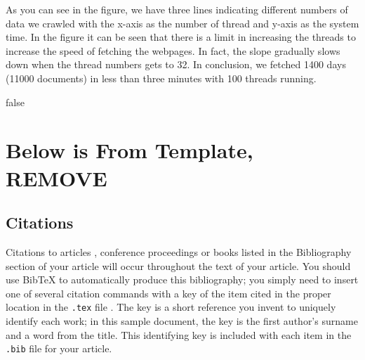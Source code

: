 \documentclass{sig-alternate-05-2015}
\begin{document}

As you can see in the figure, we have three lines indicating different numbers of data we crawled with the x-axis as the number of thread and y-axis as the system time. In the figure it can be seen that there is a limit in increasing the threads to increase the speed of fetching the webpages. In fact, the slope gradually slows down when the thread numbers gets to 32. In conclusion, we fetched 1400 days (11000 documents) in less than three minutes with 100 threads running.  




%
%
\if false

\section{Below is From Template, REMOVE}
\subsection{Citations}
Citations to articles \cite{bowman:reasoning,
clark:pct, braams:babel, herlihy:methodology},
conference proceedings \cite{clark:pct} or
books \cite{salas:calculus, Lamport:LaTeX} listed
in the Bibliography section of your
article will occur throughout the text of your article.
You should use BibTeX to automatically produce this bibliography;
you simply need to insert one of several citation commands with
a key of the item cited in the proper location in
the \texttt{.tex} file \cite{Lamport:LaTeX}.
The key is a short reference you invent to uniquely
identify each work; in this sample document, the key is
the first author's surname and a
word from the title.  This identifying key is included
with each item in the \texttt{.bib} file for your article.
\end{document}
